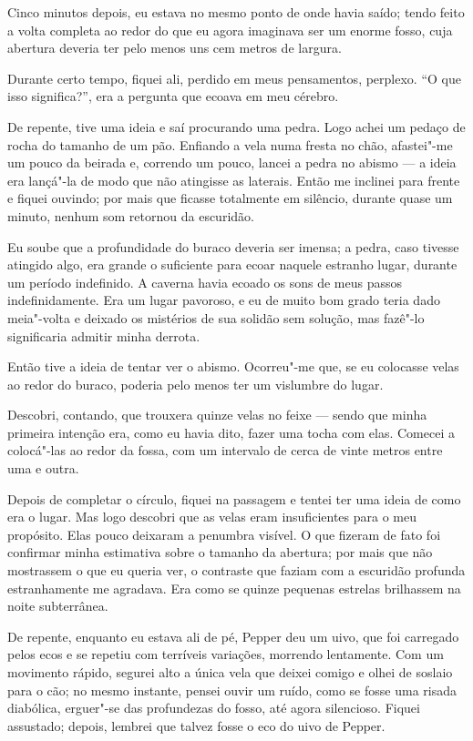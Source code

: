 Cinco minutos depois, eu estava no mesmo ponto de onde havia saído; tendo feito a volta completa ao redor do que eu
agora imaginava ser um enorme fosso, cuja abertura deveria ter pelo menos uns cem metros de largura.

Durante certo tempo, fiquei ali, perdido em meus pensamentos, perplexo. ``O que isso significa?'', era a pergunta que
ecoava em meu cérebro.

De repente, tive uma ideia e saí procurando uma pedra. Logo achei um pedaço de rocha do tamanho de um pão. Enfiando a
vela numa fresta no chão, afastei"-me um pouco da beirada e, correndo um pouco, lancei a pedra no abismo --- a ideia era
lançá"-la de modo que não atingisse as laterais. Então me inclinei para frente e fiquei ouvindo; por mais que
ficasse totalmente em silêncio, durante quase um minuto, nenhum som retornou da escuridão.

Eu soube que a profundidade do buraco deveria ser imensa; a pedra, caso tivesse atingido algo, era grande o
suficiente para ecoar naquele estranho lugar, durante um período indefinido. A caverna havia ecoado os sons de meus
passos indefinidamente. Era um lugar pavoroso, e eu de muito bom grado teria dado meia"-volta e deixado os mistérios de
sua solidão sem solução, mas fazê"-lo significaria admitir minha derrota.

Então tive a ideia de tentar ver o abismo. Ocorreu"-me que, se eu colocasse velas ao redor do buraco, poderia pelo
menos ter um vislumbre do lugar.

Descobri, contando, que trouxera quinze velas no feixe --- sendo que minha primeira intenção era, como eu havia dito,
fazer uma tocha com elas. Comecei a colocá"-las ao redor da fossa, com um intervalo de cerca de vinte metros entre uma e
outra.

Depois de completar o círculo, fiquei na passagem e tentei ter uma ideia de como era o lugar. Mas logo descobri
que as velas eram insuficientes para o meu propósito. Elas pouco deixaram a
penumbra visível. O que fizeram de fato foi confirmar minha estimativa sobre o tamanho da abertura; por mais que não
mostrassem o que eu queria ver, o contraste que faziam com a escuridão profunda estranhamente me agradava. Era como se
quinze pequenas estrelas brilhassem na noite subterrânea.

De repente, enquanto eu estava ali de pé, Pepper deu um uivo, que foi carregado pelos ecos e se repetiu com
terríveis variações, morrendo lentamente. Com um movimento rápido, segurei alto a única vela que deixei comigo e olhei
de soslaio para o cão; no mesmo instante, pensei ouvir um ruído, como se fosse uma risada diabólica, erguer"-se das
profundezas do fosso, até agora silencioso. Fiquei assustado; depois, lembrei que talvez fosse o eco do uivo de Pepper.

